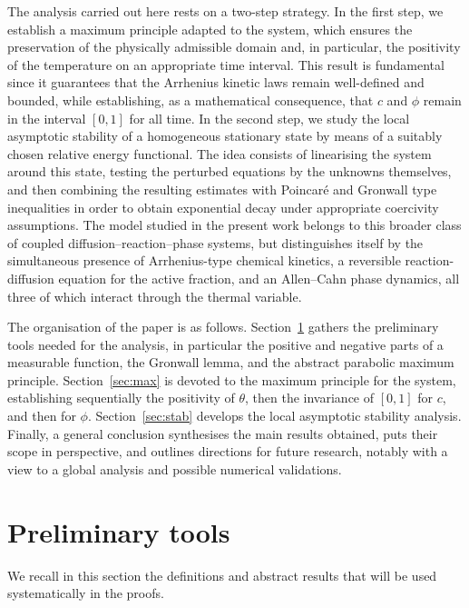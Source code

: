 \documentclass[final,1p,times]{elsarticle}
\numberwithin{equation}{section}
\begin{document}
	The analysis carried out here rests on a two-step strategy. In the first step, we establish a maximum principle adapted to the system, which ensures the preservation of the physically admissible domain and, in particular, the positivity of the temperature on an appropriate time interval. This result is fundamental since it guarantees that the Arrhenius kinetic laws remain well-defined and bounded, while establishing, as a mathematical consequence, that $c$ and $\phi$ remain in the interval $[0,1]$ for all time. In the second step, we study the local asymptotic stability of a homogeneous stationary state by means of a suitably chosen relative energy functional. The idea consists of linearising the system around this state, testing the perturbed equations by the unknowns themselves, and then combining the resulting estimates with Poincaré and Gronwall type inequalities in order to obtain exponential decay under appropriate coercivity assumptions.  The model studied in the present work belongs 
	to this broader class of coupled diffusion--reaction--phase systems, but 
	distinguishes itself by the simultaneous presence of Arrhenius-type chemical 
	kinetics, a reversible reaction-diffusion equation for the active fraction, and 
	an Allen--Cahn phase dynamics, all three of which interact through the thermal 
	variable.
	
	The organisation of the paper is as follows. Section~\ref{sec:prelim} gathers the preliminary tools needed for the analysis, in particular the positive and negative parts of a measurable function, the Gronwall lemma, and the abstract parabolic maximum principle. Section~\ref{sec:max} is devoted to the maximum principle for the system, establishing sequentially the positivity of $\theta$, then the invariance of $[0,1]$ for $c$, and then for $\phi$. Section~\ref{sec:stab} develops the local asymptotic stability analysis. Finally, a general conclusion synthesises the main results obtained, puts their scope in perspective, and outlines directions for future research, notably with a view to a global analysis and possible numerical validations.
	\section{Preliminary tools}
	\label{sec:prelim}
	
	We recall in this section the definitions and abstract results that will be used systematically in the proofs.
	
\end{document}
